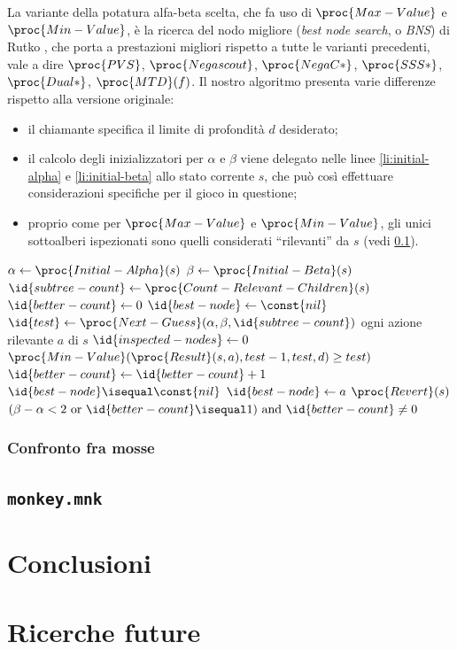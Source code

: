 \documentclass{article}
\begin{document}
La variante della potatura alfa-beta scelta, che fa uso di $\proc{Max-Value}$ e
$\proc{Min-Value}$, è la ricerca del nodo migliore (\emph{best node search}, o
\emph{BNS}) di Rutko \cite{edseul.200009163084620110101}, che porta a
prestazioni migliori rispetto a tutte le varianti precedenti, vale a dire
$\proc{PVS}$, $\proc{Negascout}$, $\proc{NegaC*}$, $\proc{SSS*}$,
$\proc{Dual*}$, $\proc{MTD}(f)$. Il nostro algoritmo presenta varie differenze
rispetto alla versione originale:
\begin{itemize}
    \item il chiamante specifica il limite di profondità $d$ desiderato;
    \item il calcolo degli inizializzatori per $\alpha$ e $\beta$ viene delegato
      nelle linee \ref{li:initial-alpha} e \ref{li:initial-beta} allo stato
      corrente $s$, che può così effettuare considerazioni specifiche per il
      gioco in questione;
    \item proprio come per $\proc{Max-Value}$ e $\proc{Min-Value}$, gli unici
      sottoalberi ispezionati sono quelli considerati ``rilevanti'' da $s$ (vedi
      \ref{pattern-search}).
\end{itemize}

\begin{codebox}
  \li  $\alpha \gets \proc{Initial-Alpha}(s)$ \label{li:initial-alpha}
  \li  $\beta \gets \proc{Initial-Beta}(s)$ \label{li:initial-beta}
  \li  $\id{subtree-count} \gets \proc{Count-Relevant-Children}(s)$
  \li  $\id{better-count} \gets 0$
  \li  \Repeat
  \li    $\id{best-node} \gets \const{nil}$
  \li    $\id{test} \gets \proc{Next-Guess}(\alpha, \beta, \id{subtree-count})$
  \li    \For ogni azione rilevante $a$ di $s$
  \li      \Do
             $\id{inspected-nodes} \gets 0$
  \li        \If $\proc{Min-Value}(\proc{Result}(s, a), test - 1, test, d) \geq test)$
  \li          \Then
                 $\id{better-count} \gets \id{better-count} + 1$
  \li            \If $\id{best-node} \isequal \const{nil}$
  \li              \Then
                     $\id{best-node} \gets a$
  \li              \End
               \End
  \li        $\proc{Revert}(s)$
  \li      \End
  \li  \Until $(\beta - \alpha < 2 \mbox{ or } \id{better-count} \isequal 1)
       \mbox{ and } \id{better-count} \neq 0$
\end{codebox}

\subsubsection{Confronto fra mosse}

\subsection{\texttt{monkey.mnk}} \label{pattern-search}

\section{Conclusioni}

\section{Ricerche future}

\begin{sloppypar}
\printbibliography[
  heading=bibintoc
]
\end{sloppypar}
\end{document}
